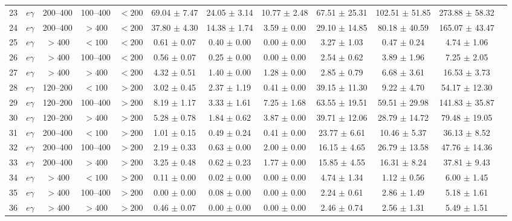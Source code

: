 \begin{table}[htbp]
{\begin{tabular}{|c|c|c|c|c|c|c|c|c|c|c|c|}
23 & $e\gamma$ & 200--400 & 100--400 & $<200$ & 69.04 $\pm$ 7.47 & 24.05 $\pm$ 3.14 & 10.77 $\pm$ 2.48 & 67.51 $\pm$ 25.31 & 102.51 $\pm$ 51.85 & 273.88 $\pm$ 58.32 &  \\
24 & $e\gamma$ & 200--400 & $>400$ & $<200$ & 37.80 $\pm$ 4.30 & 14.38 $\pm$ 1.74 & 3.59 $\pm$ 0.00 & 29.10 $\pm$ 14.85 & 80.18 $\pm$ 40.59 & 165.07 $\pm$ 43.47 &  \\
25 & $e\gamma$ & $>400$ & $<100$ & $<200$ & 0.61 $\pm$ 0.07 & 0.40 $\pm$ 0.00 & 0.00 $\pm$ 0.00 & 3.27 $\pm$ 1.03 & 0.47 $\pm$ 0.24 & 4.74 $\pm$ 1.06 &  \\
26 & $e\gamma$ & $>400$ & 100--400 & $<200$ & 0.56 $\pm$ 0.07 & 0.25 $\pm$ 0.00 & 0.00 $\pm$ 0.00 & 2.54 $\pm$ 0.62 & 3.89 $\pm$ 1.96 & 7.25 $\pm$ 2.05 &  \\
27 & $e\gamma$ & $>400$ & $>400$ & $<200$ & 4.32 $\pm$ 0.51 & 1.40 $\pm$ 0.00 & 1.28 $\pm$ 0.00 & 2.85 $\pm$ 0.79 & 6.68 $\pm$ 3.61 & 16.53 $\pm$ 3.73 &  \\
28 & $e\gamma$ & 120--200 & $<100$ & $>200$ & 3.02 $\pm$ 0.45 & 2.37 $\pm$ 1.19 & 0.41 $\pm$ 0.00 & 39.15 $\pm$ 11.30 & 9.22 $\pm$ 4.70 & 54.17 $\pm$ 12.30 &  \\
29 & $e\gamma$ & 120--200 & 100--400 & $>200$ & 8.19 $\pm$ 1.17 & 3.33 $\pm$ 1.61 & 7.25 $\pm$ 1.68 & 63.55 $\pm$ 19.51 & 59.51 $\pm$ 29.98 & 141.83 $\pm$ 35.87 &  \\
30 & $e\gamma$ & 120--200 & $>400$ & $>200$ & 5.28 $\pm$ 0.78 & 1.84 $\pm$ 0.62 & 3.87 $\pm$ 0.00 & 39.71 $\pm$ 12.06 & 28.79 $\pm$ 14.72 & 79.48 $\pm$ 19.05 &  \\
31 & $e\gamma$ & 200--400 & $<100$ & $>200$ & 1.01 $\pm$ 0.15 & 0.49 $\pm$ 0.24 & 0.41 $\pm$ 0.00 & 23.77 $\pm$ 6.61 & 10.46 $\pm$ 5.37 & 36.13 $\pm$ 8.52 &  \\
32 & $e\gamma$ & 200--400 & 100--400 & $>200$ & 2.19 $\pm$ 0.33 & 0.63 $\pm$ 0.00 & 2.00 $\pm$ 0.00 & 16.15 $\pm$ 4.65 & 26.79 $\pm$ 13.58 & 47.76 $\pm$ 14.36 &  \\
33 & $e\gamma$ & 200--400 & $>400$ & $>200$ & 3.25 $\pm$ 0.48 & 0.62 $\pm$ 0.23 & 1.77 $\pm$ 0.00 & 15.85 $\pm$ 4.55 & 16.31 $\pm$ 8.24 & 37.81 $\pm$ 9.43 &  \\
34 & $e\gamma$ & $>400$ & $<100$ & $>200$ & 0.11 $\pm$ 0.00 & 0.02 $\pm$ 0.00 & 0.00 $\pm$ 0.00 & 4.74 $\pm$ 1.34 & 1.12 $\pm$ 0.56 & 6.00 $\pm$ 1.45 &  \\
35 & $e\gamma$ & $>400$ & 100--400 & $>200$ & 0.00 $\pm$ 0.00 & 0.08 $\pm$ 0.00 & 0.00 $\pm$ 0.00 & 2.24 $\pm$ 0.61 & 2.86 $\pm$ 1.49 & 5.18 $\pm$ 1.61 &  \\
36 & $e\gamma$ & $>400$ & $>400$ & $>200$ & 0.46 $\pm$ 0.07 & 0.00 $\pm$ 0.00 & 0.00 $\pm$ 0.00 & 2.46 $\pm$ 0.74 & 2.56 $\pm$ 1.31 & 5.49 $\pm$ 1.51 &  \\
\hline
\end{tabular}}
\end{table}
